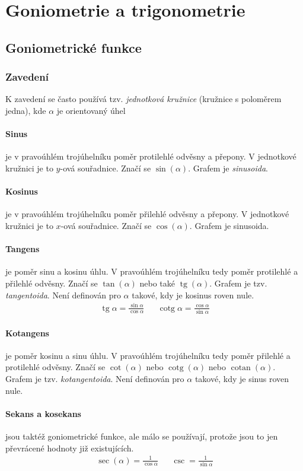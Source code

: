 \documentclass[12pt]{article}
\DeclareMathOperator{\tg}{tg}
\DeclareMathOperator{\cotg}{cotg}
\DeclareMathOperator{\cotan}{cotan}
\begin{document}
\section{Goniometrie a trigonometrie}

\subsection{Goniometrické funkce}
\subsubsection{Zavedení}
\label{sec:zavedeni_gonio}
K zavedení se často používá tzv. \emph{jednotková kružnice} (kružnice s poloměrem jedna), kde $\alpha$ je orientovaný úhel
\paragraph{Sinus} je v pravoúhlém trojúhelníku poměr protilehlé odvěsny a přepony. V jednotkové kružnici je to $y$-ová souřadnice. Značí se $\sin(\alpha)$. Grafem je \emph{sinusoida}.
\paragraph{Kosinus} je v pravoúhlém trojúhelníku poměr přilehlé odvěsny a přepony. V jednotkové kružnici je to $x$-ová souřadnice. Značí se $\cos(\alpha)$. Grafem je sinusoida.
\paragraph{Tangens} je poměr sinu a kosinu úhlu. V pravoúhlém trojúhelníku tedy poměr protilehlé a přilehlé odvěsny. Značí se $\tan (\alpha)$ nebo také $\tg ( \alpha)$. Grafem je tzv. \emph{tangentoida}. Není definován pro $\alpha$ takové, kdy je kosinus roven nule.
\begin{align}
\tg \alpha = \frac{\sin \alpha}{\cos \alpha} && \cotg \alpha = \frac{\cos \alpha}{\sin \alpha}
\end{align}
\paragraph{Kotangens} je poměr kosinu a sinu úhlu. V pravoúhlém trojúhelníku tedy poměr přilehlé a protilehlé odvěsny. Značí se $\cot (\alpha)$ nebo $\cotg ( \alpha)$ nebo $ \cotan ( \alpha )$. Grafem je tzv. \emph{kotangentoida}. Není definován pro $\alpha$ takové, kdy je sinus roven nule.
\paragraph{Sekans a kosekans} jsou taktéž goniometrické funkce, ale málo se používají, protože jsou to jen převrácené hodnoty již existujících.
\begin{align}
\sec( \alpha) = \frac{1}{\cos \alpha} && \csc = \frac{1}{\sin \alpha}
\end{align}
\end{document}
